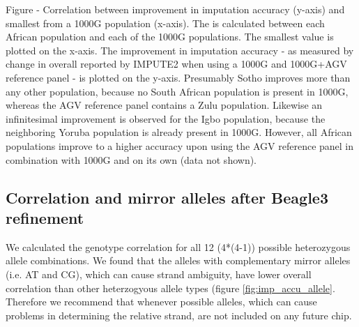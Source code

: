 Figure - Correlation between improvement in imputation accuracy (y-axis) and smallest  from a \gls{1000G} population (x-axis). The  is calculated between each African population and each of the \gls{1000G} populations. The smallest value is plotted on the x-axis. The improvement in imputation accuracy - as measured by change in overall  reported by IMPUTE2 when using a \gls{1000G} and \gls{1000G}+\gls{AGV} reference panel - is plotted on the y-axis. Presumably Sotho improves more than any other population, because no South African population is present in \gls{1000G}, whereas the \gls{AGV} reference panel contains a Zulu population. Likewise an infinitesimal improvement is observed for the Igbo population, because the neighboring Yoruba population is already present in \gls{1000G}. However, all African populations improve to a higher accuracy upon using the AGV reference panel in combination with \gls{1000G} and on its own (data not shown).


\subsection{Correlation and mirror alleles after Beagle3 refinement}
We calculated the genotype correlation for all 12 (4*(4-1)) possible heterozygous allele combinations. We found that the alleles with complementary mirror alleles (i.e. AT and CG), which can cause strand ambiguity, have lower overall correlation than other heterzogyous allele types (figure \ref{fig:imp_accu_allele}. Therefore we recommend that whenever possible alleles, which can cause problems in determining the relative strand, are not included on any future chip.
